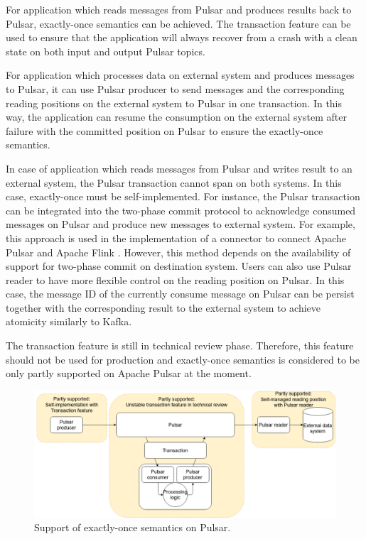 For application which reads messages from Pulsar and produces results back to Pulsar, exactly-once semantics can be achieved. The transaction feature can be used to ensure that the application will always recover from a crash with a clean state on both input and output Pulsar topics.   

For application which processes data on external system and produces messages to Pulsar, it can use Pulsar producer to send messages and the corresponding reading positions on the external system to Pulsar in one transaction.  In this way, the application can resume the consumption on the external system after failure with the committed position on Pulsar to ensure the exactly-once semantics. 

In case of application which reads messages from Pulsar and writes result to an external system, the Pulsar transaction cannot span on both systems. In this case, exactly-once must be self-implemented. For instance, the Pulsar transaction can be integrated into the two-phase commit protocol \cite{twophasecommit} to acknowledge consumed messages on Pulsar and produce new messages to external system. For example, this approach is used in the implementation of a connector to connect Apache Pulsar and Apache Flink \cite{pulsarflinkconnector}. However, this method depends on the availability of support for two-phase commit on destination system. Users can also use Pulsar reader to have more flexible control on the reading position on Pulsar. In this case, the message ID of the currently consume message on Pulsar can be persist together with the corresponding result to the external system to achieve atomicity similarly to Kafka.

The transaction feature is still in technical review phase. Therefore, this feature should not be used for production and exactly-once semantics is considered to be only partly supported on Apache Pulsar at the moment.


\begin{figure}[h]
	\centering
	\includegraphics[width=\linewidth]{images/exactly-once-pulsar.png}
	\caption{Support of exactly-once semantics on Pulsar.}
	\label{fig:exactlyoncepulsar}
\end{figure}




